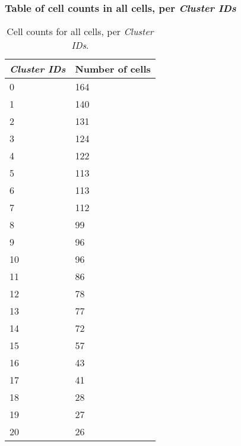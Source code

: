\subsubsection{Table of cell counts in all cells, per \emph{Cluster IDs}}\begin{table}[h]
\centering
\label{my-label}
\begin{tabular}{@{}ll@{}}
\toprule

\emph{Cluster IDs}& Number of cells \\ \midrule
0 & 164 \\

1 & 140 \\

2 & 131 \\

3 & 124 \\

4 & 122 \\

5 & 113 \\

6 & 113 \\

7 & 112 \\

8 & 99 \\

9 & 96 \\

10 & 96 \\

11 & 86 \\

12 & 78 \\

13 & 77 \\

14 & 72 \\

15 & 57 \\

16 & 43 \\

17 & 41 \\

18 & 28 \\

19 & 27 \\

20 & 26 \\
\bottomrule
\end{tabular}
\caption{Cell counts for all cells, per \emph{Cluster IDs}.}
\end{table}

